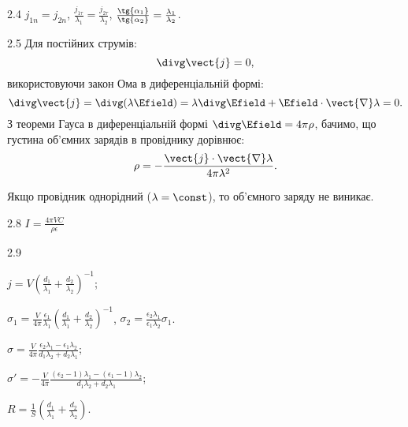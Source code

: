 \protect \section *{}
\begin{Solution}{2.{4}}
	$j_{1n} = j_{2n}$, $\frac{j_{1\tau}}{\lambda_1} = \frac{j_{2\tau}}{\lambda_2}$,
	$\frac{\tg{\alpha_1}}{\tg{\alpha_2}} = \frac{\lambda_1}{\lambda_2}$.
\end{Solution}
\begin{Solution}{2.{5}}
	Для постійних струмів:
	\begin{equation}
		\divg\vect{j} = 0,
	\end{equation}
	використовуючи закон Ома в диференціальній формі:
	\begin{equation}
		\divg\vect{j} = \divg(\lambda\Efield) = \lambda\divg\Efield + \Efield\cdot\vect{\nabla}\lambda = 0.
	\end{equation}
	З теореми Гауса в диференціальній формі $\divg\Efield = 4\pi\rho$, бачимо, що густина об'ємних зарядів в провіднику дорівнює:
	\begin{equation}
		\rho = - \frac{\vect{j}\cdot\vect{\nabla}\lambda}{4\pi\lambda^2}.
	\end{equation}

	Якщо провідник однорідний ($\lambda = \const$), то об'ємного заряду не виникає.
\end{Solution}
\begin{Solution}{2.{8}}
	$ I = \frac{4\pi VC}{\rho \epsilon} $
\end{Solution}
\begin{Solution}{2.{9}}
	\begin{enumerate*}[label=\alph*)]
		\item  $j = V\left( \frac{d_1}{\lambda_1} + \frac{d_2}{\lambda_2}\right)^{-1}$;
		\item $\sigma_1  = \frac{V}{4\pi} \frac{\epsilon_1}{\lambda_1} \left( \frac{d_1}{\lambda_1} + \frac{d_2}{\lambda_2}\right)^{-1}$, $\sigma_2  = \frac{\epsilon_2\lambda_1}{\epsilon_1\lambda_2} \sigma_1$.
		\item $\sigma = \frac{V}{4\pi} \frac{\epsilon_2\lambda_1 - \epsilon_1\lambda_2}{d_1\lambda_2 + d_2\lambda_1}$;
		\item $\sigma' = - \frac{V}{4\pi} \frac{(\epsilon_2 - 1)\lambda_1 - (\epsilon_1 - 1)\lambda_2}{d_1\lambda_2 + d_2\lambda_1}$;
		\item $R = \frac1S\left( \frac{d_1}{\lambda_1} + \frac{d_2}{\lambda_2}\right) $.
	\end{enumerate*}
\end{Solution}
